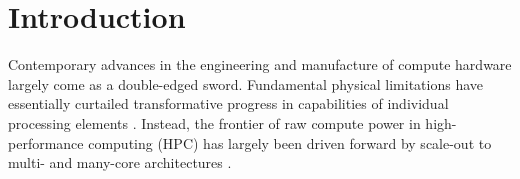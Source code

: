 \section{Introduction} \label{sec:introduction}

Contemporary advances in the engineering and manufacture of compute hardware largely come as a double-edged sword.
Fundamental physical limitations have essentially curtailed transformative progress in capabilities of individual processing elements \citep{sutter2005free}.
Instead, the frontier of raw compute power in high-performance computing (HPC) has largely been driven forward by scale-out to multi- and many-core architectures \citep{morgenstern2021unparalleled}.


